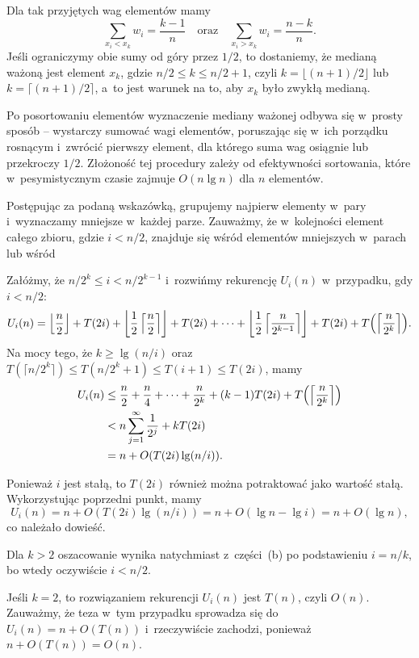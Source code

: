 
\subproblem %
Dla tak przyjętych wag elementów mamy
\[
	\sum_{x_i<x_k}w_i = \frac{k-1}{n} \quad\text{oraz}\quad \sum_{x_i>x_k}w_i = \frac{n-k}{n}.
\]
Jeśli ograniczymy obie sumy od góry przez $1/2$, to dostaniemy, że medianą ważoną jest element $x_k$, gdzie $n/2\le k\le n/2+1$, czyli $k=\lfloor(n+1)/2\rfloor$ lub $k=\lceil(n+1)/2\rceil$, a~to jest warunek na to, aby $x_k$ było zwykłą medianą.

\subproblem %
Po posortowaniu elementów wyznaczenie mediany ważonej odbywa się w~prosty sposób -- wystarczy sumować wagi elementów, poruszając się w~ich porządku rosnącym i~zwrócić pierwszy element, dla którego suma wag osiągnie lub przekroczy $1/2$. Złożoność tej procedury zależy od efektywności sortowania, które w~pesymistycznym czasie zajmuje $O(n\lg n)$ dla $n$ elementów.

\subproblem %
\subproblem %
\subproblem %


\subproblem %

\noindent Postępując za podaną wskazówką, grupujemy najpierw elementy w~pary i~wyznaczamy mniejsze w~każdej parze. Zauważmy, że  w~kolejności element całego zbioru, gdzie $i<n/2$, znajduje się wśród elementów mniejszych w~parach lub wśród 

\subproblem %
Załóżmy, że $n/2^k\le i<n/2^{k-1}$ i~rozwińmy rekurencję $U_i(n)$ w~przypadku, gdy $i<n/2$:
\[
	U_i(n) = \left\lfloor\frac{n}{2}\right\rfloor+T(2i)+\left\lfloor\frac{1}{2}\left\lceil\frac{n}{2}\right\rceil\right\rfloor+T(2i)+\dots+\left\lfloor\frac{1}{2}\left\lceil\frac{n}{2^{k-1}}\right\rceil\right\rfloor+T(2i)+T\Bigl(\left\lceil\frac{n}{2^k}\right\rceil\Bigr).
\]
Na mocy tego, że $k\ge\lg(n/i)$ oraz $T(\lceil n/2^k\rceil)\le T(n/2^k+1)\le T(i+1)\le T(2i)$, mamy
\begin{align*}
	U_i(n) &\le \frac{n}{2}+\frac{n}{4}+\dots+\frac{n}{2^k}+(k-1)T(2i)+T\Bigl(\left\lceil\frac{n}{2^k}\right\rceil\Bigr) \\
	&< n\sum_{j=1}^\infty\frac{1}{2^j}+kT(2i) \\
	&= n+O(T(2i)\lg(n/i)).
\end{align*}

\subproblem %
Ponieważ $i$ jest stałą, to $T(2i)$ również można potraktować jako wartość stałą. Wykorzystując poprzedni punkt, mamy
\[
	U_i(n) = n+O(T(2i)\lg(n/i)) = n+O(\lg n-\lg i) = n+O(\lg n),
\]
co należało dowieść.

\subproblem %
Dla $k>2$ oszacowanie wynika natychmiast z~części~(b) po podstawieniu $i=n/k$, bo wtedy oczywiście $i<n/2$.

Jeśli $k=2$, to rozwiązaniem rekurencji $U_i(n)$ jest $T(n)$, czyli $O(n)$. Zauważmy, że teza w~tym przypadku sprowadza się do $U_i(n)=n+O(T(n))$ i~rzeczywiście zachodzi, ponieważ $n+O(T(n))=O(n)$.

\endinput
